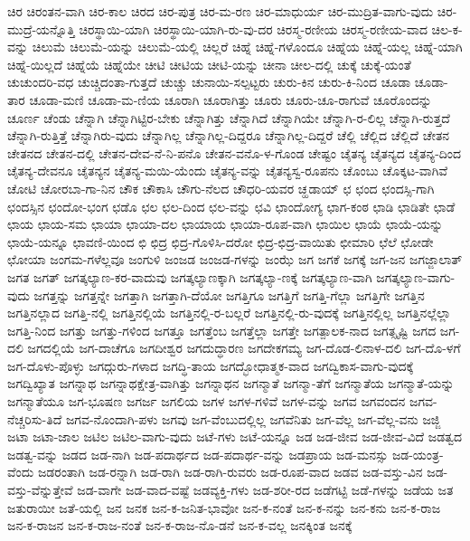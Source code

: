 {ಚಿರ
ಚಿರಂತನ-ವಾಗಿ
ಚಿರ-ಕಾಲ
ಚಿರದ
ಚಿರ-ಪುತ್ರ
ಚಿರ-ಮ-ರಣ
ಚಿರ-ಮಾಧುರ್ಯ
ಚಿರ-ಮುದ್ರಿತ-ವಾಗು-ವುದು
ಚಿರ-ಮುದ್ರೆ-ಯನ್ನೊತ್ತಿ
ಚಿರಸ್ಥಾಯಿ-ಯಾಗಿ
ಚಿರಸ್ಥಾಯಿ-ಯಾಗಿ-ರು-ವು-ದರ
ಚಿರಸ್ಮ-ರಣೀಯ
ಚಿರಸ್ಮ-ರಣೀಯ-ವಾದ
ಚಿಲ-ಕ-ವನ್ನು
ಚಿಲುಮೆ
ಚಿಲುಮೆ-ಯನ್ನು
ಚಿಲುಮೆ-ಯಲ್ಲಿ
ಚಿಲ್ಲರೆ
ಚಿಹ್ನೆ
ಚಿಹ್ನೆ-ಗಳೊಂದೂ
ಚಿಹ್ನೆಯ
ಚಿಹ್ನೆ-ಯಲ್ಲ
ಚಿಹ್ನೆ-ಯಾಗಿ
ಚಿಹ್ನೆ-ಯಿಲ್ಲದೆ
ಚಿಹ್ನೆಯೆ
ಚಿಹ್ನೆಯೇ
ಚೀಟಿ
ಚೀಟಿಯ
ಚೀಟಿ-ಯನ್ನು
ಚೀನಾ
ಚೀಲ-ದಲ್ಲಿ
ಚುಕ್ಕೆ
ಚುಕ್ಕೆ-ಯಂತೆ
ಚುಚುಂದರಿ-ವಧ
ಚುಚ್ಚಿದಂತಾ-ಗುತ್ತದೆ
ಚುಚ್ಚು
ಚುನಾಯಿ-ಸಲ್ಪಟ್ಟರು
ಚುರು-ಕಿನ
ಚುರು-ಕಿ-ನಿಂದ
ಚೂಡಾ
ಚೂಡಾ-ತಾರ
ಚೂಡಾ-ಮಣಿ
ಚೂಡಾ-ಮ-ಣಿಯ
ಚೂರಾಗಿ
ಚೂರಾಗಿತ್ತು
ಚೂರು
ಚೂರು-ಚೂ-ರಾಗುವೆ
ಚೂರೊಂದನ್ನು
ಚೂರ್ಣ
ಚೆಂಡು
ಚೆನ್ನಾಗಿ
ಚೆನ್ನಾಗಿಟ್ಟಿರ-ಬೇಕು
ಚೆನ್ನಾಗಿತ್ತು
ಚೆನ್ನಾಗಿದೆ
ಚೆನ್ನಾಗಿಯೇ
ಚೆನ್ನಾಗಿ-ರ-ಲಿಲ್ಲ
ಚೆನ್ನಾಗಿ-ರುತ್ತದೆ
ಚೆನ್ನಾಗಿ-ರುತ್ತಿತ್ತೆ
ಚೆನ್ನಾಗಿರು-ವುದು
ಚೆನ್ನಾಗಿಲ್ಲ
ಚೆನ್ನಾಗಿಲ್ಲ-ದಿದ್ದರೂ
ಚೆನ್ನಾಗಿಲ್ಲ-ದಿದ್ದರೆ
ಚೆಲ್ಲಿ
ಚೆಲ್ಲಿದ
ಚೆಲ್ಲಿದೆ
ಚೇತನ
ಚೇತನದ
ಚೇತನ-ದಲ್ಲಿ
ಚೇತನ-ದೇವ-ನೆ-ನಿ-ಪನೊ
ಚೇತನ-ವನೊ-ಳ-ಗೊಂಡ
ಚೇಷ್ಟಂ
ಚೈತನ್ಯ
ಚೈತನ್ಯದ
ಚೈತನ್ಯ-ದಿಂದ
ಚೈತನ್ಯ-ದೇವನೂ
ಚೈತನ್ಯನ
ಚೈತನ್ಯ-ಮಯಿ-ಯೆಂದು
ಚೈತನ್ಯ-ವನ್ನು
ಚೈತನ್ಯಸ್ವ-ರೂಪನು
ಚೊಂಬು
ಚೊಕ್ಕಟ-ವಾಗಿವೆ
ಚೋಟಿ
ಚೋರಬಾ-ಗಾ-ನಿನ
ಚೌಕ
ಚೌಕಾಸಿ
ಚೌಗು-ನೆಲದ
ಚೌಧರಿ-ಯವರ
ಚ್ಹಡಾಯ್
ಛ
ಛಂದ
ಛಂದಸ್ಸಿ-ಗಾಗಿ
ಛಂದಸ್ಸಿನ
ಛಂದೋ-ಭಂಗ
ಛಡೊ
ಛಲ
ಛಲ-ದಿಂದ
ಛಲ-ವನ್ನು
ಛವಿ
ಛಾಂದೋಗ್ಯ
ಛಾಗ-ಕಂಠ
ಛಾಡಿ
ಛಾಡಿತೇ
ಛಾಡೆ
ಛಾಯ
ಛಾಯ-ಸಮ
ಛಾಯಾ
ಛಾಯಾ-ದಲ
ಛಾಯಾಯ
ಛಾಯಾ-ರೂಪ-ವಾಗಿ
ಛಾಯಿಲ
ಛಾಯೆ
ಛಾಯೆ-ಯನ್ನು
ಛಾಯೆ-ಯನ್ನೂ
ಛಾವಣಿ-ಯಿಂದ
ಛಿ
ಛಿದ್ರ
ಛಿದ್ರ-ಗೊಳಿಸಿ-ದರೋ
ಛಿದ್ರ-ಛಿದ್ರ-ವಾಯಿತು
ಛೀಮಾರಿ
ಛೆಲೆ
ಛೋಡೇ
ಛೋಯಾ
ಜಂಗಮ-ಗಳೆಲ್ಲವೂ
ಜಂಗುಳಿ
ಜಂಜಡ
ಜಂಜಡ-ಗಳನ್ನು
ಜಂಝೆ
ಜಗ
ಜಗಕೆ
ಜಗಕ್ಕೆ
ಜಗ-ಜನ
ಜಗಜ್ಜಾಲಾತ್
ಜಗತ
ಜಗತ್
ಜಗತ್ಕಲ್ಯಾಣ-ಕರ-ವಾದುವು
ಜಗತ್ಕಲ್ಯಾಣಕ್ಕಾಗಿ
ಜಗತ್ಕಲ್ಯಾ-ಣಕ್ಕೆ
ಜಗತ್ಕಲ್ಯಾಣ-ವಾಗಿ
ಜಗತ್ಕಲ್ಯಾಣ-ವಾಗು-ವುದು
ಜಗತ್ತನ್ನು
ಜಗತ್ತನ್ನೇ
ಜಗತ್ತಾಗಿ
ಜಗತ್ತಾಗಿ-ದೆಯೋ
ಜಗತ್ತಿಗೂ
ಜಗತ್ತಿಗೆ
ಜಗತ್ತಿ-ಗೆಲ್ಲಾ
ಜಗತ್ತಿಗೇ
ಜಗತ್ತಿನ
ಜಗತ್ತಿನಲ್ಲಾದ
ಜಗತ್ತಿ-ನಲ್ಲಿ
ಜಗತ್ತಿನಲ್ಲಿಯೆ
ಜಗತ್ತಿನಲ್ಲಿ-ರ-ಬಲ್ಲರೆ
ಜಗತ್ತಿನಲ್ಲಿ-ರು-ವುದಕ್ಕೆ
ಜಗತ್ತಿನಲ್ಲಿಲ್ಲ
ಜಗತ್ತಿನಲ್ಲೆಲ್ಲಾ
ಜಗತ್ತಿ-ನಿಂದ
ಜಗತ್ತು
ಜಗತ್ತು-ಗಳಿಂದ
ಜಗತ್ತೂ
ಜಗತ್ತೆಂಬ
ಜಗತ್ತೆಲ್ಲಾ
ಜಗತ್ತೇ
ಜಗತ್ಪಾಲಕ-ನಾದ
ಜಗತ್ಸೃಷ್ಟಿ
ಜಗದ
ಜಗ-ದಲಿ
ಜಗದಲ್ಲಿಯೆ
ಜಗ-ದಾಚೆಗೂ
ಜಗದೀಶ್ವರ
ಜಗದುದ್ಧಾರಣ
ಜಗದೇಕಗಮ್ಯ
ಜಗ-ದೊಡ-ಲಿನಾಳ-ದಲಿ
ಜಗ-ದೊ-ಳಗೆ
ಜಗ-ದೊಳು-ಪೊಳ್ಳು
ಜಗದ್ಗುರು-ಗಳಾದ
ಜಗದ್ಧಿ-ತಾಯ
ಜಗದ್ಭೋಧಾತ್ಮಕ-ವಾದ
ಜಗದ್ವಿಕಾಸ-ವಾಗು-ವುದಕ್ಕೆ
ಜಗದ್ವಿಖ್ಯಾತ
ಜಗನ್ನಾಥ
ಜಗನ್ನಾಥಕ್ಷೇತ್ರ-ವಾಗಿತ್ತು
ಜಗನ್ನಾಥನ
ಜಗನ್ಮಾತೆ
ಜಗನ್ಮಾ-ತೆಗೆ
ಜಗನ್ಮಾತೆಯ
ಜಗನ್ಮಾತೆ-ಯನ್ನು
ಜಗನ್ಮಾತೆಯೂ
ಜಗ-ಭೂಷಣ
ಜಗರ್ಜ
ಜಗಲಿಯ
ಜಗಳ
ಜಗಳ-ಗಳಿವೆ
ಜಗಳ-ವನ್ನು
ಜಗವ
ಜಗವಂದನ
ಜಗವ-ನೆಚ್ಚರಿಸು-ತಿದೆ
ಜಗವ-ನೊಂದಾಗಿ-ಪಳು
ಜಗವು
ಜಗ-ವೆಂಬುದಲ್ಲಿಲ್ಲ
ಜಗವೆನಿತು
ಜಗ-ವೆಲ್ಲ
ಜಗ-ವೆಲ್ಲ-ವನು
ಜಜ್ಜಿ
ಜಟಾ
ಜಟಾ-ಜಾಲ
ಜಟಿಲ
ಜಟಿಲ-ವಾಗು-ವುದು
ಜಟೆ-ಗಳು
ಜಟೆ-ಯನ್ನೂ
ಜಡ
ಜಡ-ಜೀವ
ಜಡ-ಜೀವ-ವಿದೆ
ಜಡತ್ವದ
ಜಡತ್ವ-ವನ್ನು
ಜಡದ
ಜಡ-ನಾಗಿ
ಜಡ-ಪದಾರ್ಥದ
ಜಡ-ಪದಾರ್ಥ-ವನ್ನು
ಜಡಪ್ರಾಯ
ಜಡ-ಮನಸ್ಸು
ಜಡ-ಯಂತ್ರ-ವೆಂದು
ಜಡರಂತಾಗಿ
ಜಡ-ರನ್ನಾಗಿ
ಜಡ-ರಾಗಿ
ಜಡ-ರಾಗಿ-ರುವರು
ಜಡ-ರೂಪ-ವಾದ
ಜಡವ
ಜಡ-ವಸ್ತು-ವಿನ
ಜಡ-ವಸ್ತು-ವೆನ್ನುತ್ತೇವೆ
ಜಡ-ವಾಗೇ
ಜಡ-ವಾದ-ವಷ್ಟೆ
ಜಡವ್ಯಕ್ತಿ-ಗಳು
ಜಡ-ಶರೀ-ರದ
ಜಡೆಗಟ್ಟಿ
ಜಡೆ-ಗಳನ್ನು
ಜಡೆಯ
ಜತ
ಜತುರಾಯೀ
ಜತೆ-ಯಲ್ಲಿ
ಜನ
ಜನಕ
ಜನ-ಕ-ಜನಿತ-ಭಾವೋ
ಜನ-ಕ-ನಂತೆ
ಜನ-ಕ-ನನ್ನು
ಜನ-ಕನು
ಜನ-ಕ-ರಾಜ
ಜನ-ಕ-ರಾಜನ
ಜನ-ಕ-ರಾಜ-ನಂತೆ
ಜನ-ಕ-ರಾಜ-ನೊ-ಡನೆ
ಜನ-ಕ-ವಲ್ಲ
ಜನಕ್ಕಿಂತ
ಜನಕ್ಕೆ
}
